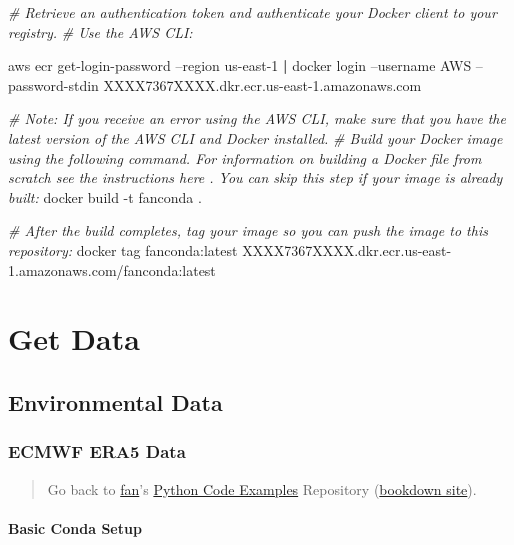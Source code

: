 \documentclass[
]{book}
\newenvironment{Shaded}{\begin{snugshade}}{\end{snugshade}}
\newcommand{\CommentTok}[1]{\textcolor[rgb]{0.56,0.35,0.01}{\textit{#1}}}
\newcommand{\ExtensionTok}[1]{#1}
\newcommand{\KeywordTok}[1]{\textcolor[rgb]{0.13,0.29,0.53}{\textbf{#1}}}
\newcommand{\NormalTok}[1]{#1}
\begin{document}
\begin{Shaded}
\begin{Highlighting}[]
\CommentTok{# Retrieve an authentication token and authenticate your Docker client to your registry.}
\CommentTok{# Use the AWS CLI:}

\ExtensionTok{aws}\NormalTok{ ecr get-login-password --region us-east-1 }\KeywordTok{|} \ExtensionTok{docker}\NormalTok{ login --username AWS --password-stdin XXXX7367XXXX.dkr.ecr.us-east-1.amazonaws.com}

\CommentTok{# Note: If you receive an error using the AWS CLI, make sure that you have the latest version of the AWS CLI and Docker installed.}
\CommentTok{# Build your Docker image using the following command. For information on building a Docker file from scratch see the instructions here . You can skip this step if your image is already built:}
\ExtensionTok{docker}\NormalTok{ build -t fanconda .}

\CommentTok{# After the build completes, tag your image so you can push the image to this repository:}
\ExtensionTok{docker}\NormalTok{ tag fanconda:latest XXXX7367XXXX.dkr.ecr.us-east-1.amazonaws.com/fanconda:latest}
\end{Highlighting}
\end{Shaded}

\hypertarget{get-data}{%
\chapter{Get Data}\label{get-data}}

\hypertarget{environmental-data}{%
\section{Environmental Data}\label{environmental-data}}

\hypertarget{ecmwf-era5-data}{%
\subsection{ECMWF ERA5 Data}\label{ecmwf-era5-data}}

\begin{quote}
Go back to \href{http://fanwangecon.github.io/}{fan}'s \href{https://fanwangecon.github.io/pyfan/}{Python Code Examples} Repository (\href{https://fanwangecon.github.io/pyfan/bookdown}{bookdown site}).
\end{quote}

\hypertarget{basic-conda-setup}{%
\subsubsection{Basic Conda Setup}\label{basic-conda-setup}}
\end{document}
